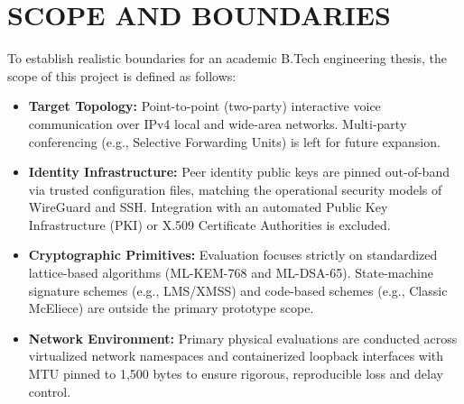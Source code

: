 \section{SCOPE AND BOUNDARIES}
To establish realistic boundaries for an academic B.Tech engineering thesis, the scope of this project is defined as follows:
\begin{itemize}
    \item \textbf{Target Topology:} Point-to-point (two-party) interactive voice communication over IPv4 local and wide-area networks. Multi-party conferencing (e.g., Selective Forwarding Units) is left for future expansion.
    \item \textbf{Identity Infrastructure:} Peer identity public keys are pinned out-of-band via trusted configuration files, matching the operational security models of WireGuard and SSH. Integration with an automated Public Key Infrastructure (PKI) or X.509 Certificate Authorities is excluded.
    \item \textbf{Cryptographic Primitives:} Evaluation focuses strictly on standardized lattice-based algorithms (ML-KEM-768 and ML-DSA-65). State-machine signature schemes (e.g., LMS/XMSS) and code-based schemes (e.g., Classic McEliece) are outside the primary prototype scope.
    \item \textbf{Network Environment:} Primary physical evaluations are conducted across virtualized network namespaces and containerized loopback interfaces with MTU pinned to 1,500 bytes to ensure rigorous, reproducible loss and delay control.
\end{itemize}

